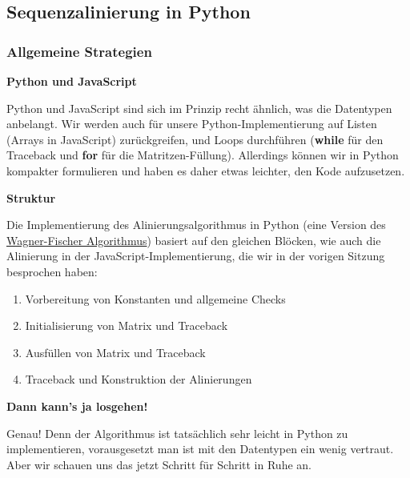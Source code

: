 
\subsection{Sequenzalinierung in Python}

\subsubsection{\texorpdfstring{{Allgemeine
Strategien}}{Allgemeine Strategien}}

\par\noindent\textbf{Python und JavaScript}

Python und JavaScript sind sich im Prinzip recht ähnlich, was die
Datentypen anbelangt. Wir werden auch für unsere Python-Implementierung
auf Listen (Arrays in JavaScript) zurückgreifen, und Loops durchführen
(\textbf{while} für den Traceback und \textbf{for} für die
Matritzen-Füllung). Allerdings können wir in Python kompakter
formulieren und haben es daher etwas leichter, den Kode aufzusetzen.




\par\noindent\textbf{Struktur}

Die Implementierung des Alinierungsalgorithmus in Python (eine Version
des \href{http://bibliography.lingpy.org?key=Wagner1974}{Wagner-Fischer
Algorithmus}) basiert auf den gleichen Blöcken, wie auch die Alinierung
in der JavaScript-Implementierung, die wir in der vorigen Sitzung
besprochen haben:

\begin{enumerate}
\itemsep1pt\parskip0pt
\item
  Vorbereitung von Konstanten und allgemeine Checks
\item
  Initialisierung von Matrix und Traceback
\item
  Ausfüllen von Matrix und Traceback
\item
  Traceback und Konstruktion der Alinierungen
\end{enumerate}




\par\noindent\textbf{Dann kann's ja losgehen!}

Genau! Denn der Algorithmus ist tatsächlich sehr leicht in Python zu
implementieren, vorausgesetzt man ist mit den Datentypen ein wenig
vertraut. Aber wir schauen uns das jetzt Schritt für Schritt in Ruhe an.



